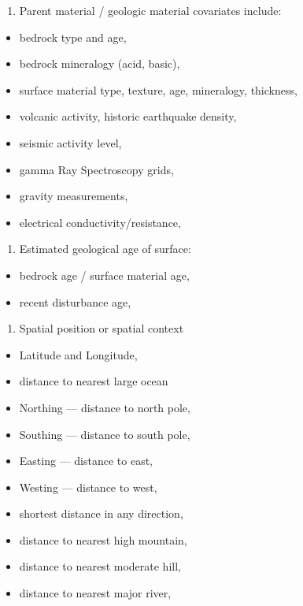 \documentclass[graybox,natbib,nospthms,UStrade]{svmono}
\providecommand{\tightlist}{%
  \setlength{\itemsep}{0pt}\setlength{\parskip}{0pt}}
\providecommand{\tightlist}{\setlength{\itemsep}{0pt}\setlength{\parskip}{0pt}}
\begin{document}
\begin{enumerate}
\def\labelenumi{\arabic{enumi}.}
\setcounter{enumi}{3}
\tightlist
\item
  Parent material / geologic material covariates include:
\end{enumerate}

\begin{itemize}
\tightlist
\item
  bedrock type and age,
\item
  bedrock mineralogy (acid, basic),
\item
  surface material type, texture, age, mineralogy, thickness,
\item
  volcanic activity, historic earthquake density,
\item
  seismic activity level,
\item
  gamma Ray Spectroscopy grids,
\item
  gravity measurements,
\item
  electrical conductivity/resistance,
\end{itemize}

\begin{enumerate}
\def\labelenumi{\arabic{enumi}.}
\setcounter{enumi}{4}
\tightlist
\item
  Estimated geological age of surface:
\end{enumerate}

\begin{itemize}
\tightlist
\item
  bedrock age / surface material age,
\item
  recent disturbance age,
\end{itemize}

\begin{enumerate}
\def\labelenumi{\arabic{enumi}.}
\setcounter{enumi}{5}
\tightlist
\item
  Spatial position or spatial context
\end{enumerate}

\begin{itemize}
\tightlist
\item
  Latitude and Longitude,
\item
  distance to nearest large ocean
\item
  Northing --- distance to north pole,
\item
  Southing --- distance to south pole,
\item
  Easting --- distance to east,
\item
  Westing --- distance to west,
\item
  shortest distance in any direction,
\item
  distance to nearest high mountain,
\item
  distance to nearest moderate hill,
\item
  distance to nearest major river,
\end{itemize}
\end{document}
